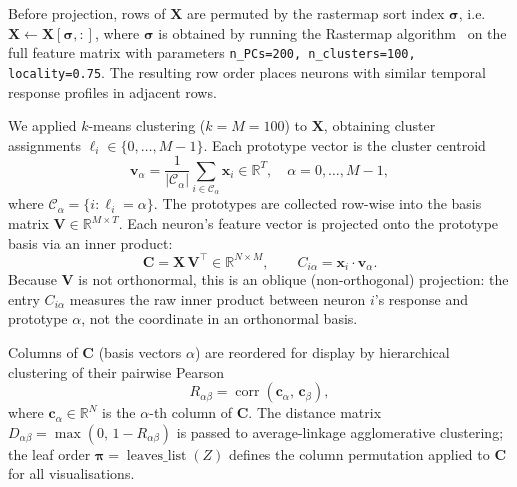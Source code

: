 \documentclass[10pt,lineno]{elife}
\begin{document}
  Before projection, rows of $\mathbf{X}$ are permuted by the rastermap
  sort index $\boldsymbol{\sigma}$, i.e.\ $\mathbf{X} \leftarrow
  \mathbf{X}[\boldsymbol{\sigma},:]$, where $\boldsymbol{\sigma}$ is
  obtained by running the Rastermap algorithm~\cite{stringer2024rastermap} on the
  full feature matrix with parameters
  \texttt{n\_PCs=200, n\_clusters=100, locality=0.75}.
  The resulting row order places neurons with similar temporal response
  profiles in adjacent rows.

  We applied $k$-means clustering ($k = M = 100$) to $\mathbf{X}$, obtaining cluster assignments $\ell_i \in \{0,\ldots,M-1\}$. Each prototype vector is the
  cluster centroid
  \begin{equation}
      \mathbf{v}_\alpha = \frac{1}{|\mathcal{C}_\alpha|}
      \sum_{i \in \mathcal{C}_\alpha} \mathbf{x}_i
      \in \mathbb{R}^T, \quad \alpha = 0,\ldots,M-1,
  \end{equation}
  where $\mathcal{C}_\alpha = \{i : \ell_i = \alpha\}$.
  The prototypes are collected row-wise into the basis matrix
  $\mathbf{V} \in \mathbb{R}^{M \times T}$.
  Each neuron's feature vector is projected onto the prototype basis
  via an inner product:
  \begin{equation}
      \mathbf{C} = \mathbf{X}\,\mathbf{V}^{\!\top}
      \in \mathbb{R}^{N \times M},
      \qquad C_{i\alpha} = \mathbf{x}_i \cdot \mathbf{v}_\alpha.
  \end{equation}
  Because $\mathbf{V}$ is not orthonormal, this is an oblique (non-orthogonal)
  projection: the entry $C_{i\alpha}$ measures the raw inner product
  between neuron $i$'s response and prototype $\alpha$, not the
  coordinate in an orthonormal basis.

  Columns of $\mathbf{C}$ (basis vectors $\alpha$) are reordered for
  display by hierarchical clustering of their pairwise Pearson
  \begin{equation}
      R_{\alpha\beta} = \operatorname{corr}(\mathbf{c}_\alpha,\,\mathbf{c}_\beta),
  \end{equation}
  where $\mathbf{c}_\alpha \in \mathbb{R}^N$ is the $\alpha$-th column of
  $\mathbf{C}$. The distance matrix $D_{\alpha\beta} =
  \max(0,\, 1 - R_{\alpha\beta})$ is passed to average-linkage
  agglomerative clustering; the leaf order
  $\boldsymbol{\pi} = \operatorname{leaves\_list}(Z)$ defines the column
  permutation applied to $\mathbf{C}$ for all visualisations.
\end{document}
